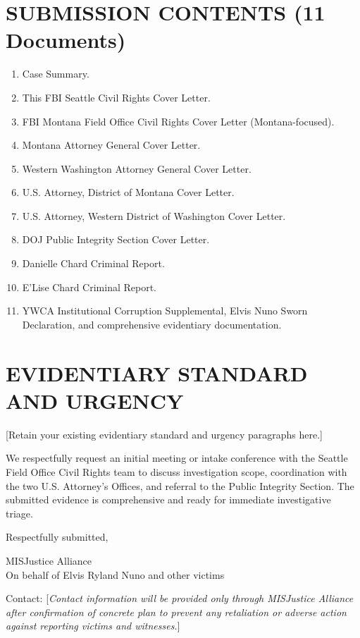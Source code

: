 \documentclass[12pt,oneside]{article}
\begin{document}
\begin{flushleft}
\section*{SUBMISSION CONTENTS (11 Documents)}

\begin{enumerate}
\item Case Summary.
\item This FBI Seattle Civil Rights Cover Letter.
\item FBI Montana Field Office Civil Rights Cover Letter (Montana-focused).
\item Montana Attorney General Cover Letter.
\item Western Washington Attorney General Cover Letter.
\item U.S. Attorney, District of Montana Cover Letter.
\item U.S. Attorney, Western District of Washington Cover Letter.
\item DOJ Public Integrity Section Cover Letter.
\item Danielle Chard Criminal Report.
\item E'Lise Chard Criminal Report.
\item YWCA Institutional Corruption Supplemental, Elvis Nuno Sworn Declaration, and comprehensive evidentiary documentation.
\end{enumerate}

\section*{EVIDENTIARY STANDARD AND URGENCY}

[Retain your existing evidentiary standard and urgency paragraphs here.]

We respectfully request an initial meeting or intake conference with the Seattle Field Office Civil Rights team to discuss investigation scope, coordination with the two U.S. Attorney's Offices, and referral to the Public Integrity Section. The submitted evidence is comprehensive and ready for immediate investigative triage.

\vspace{0.3in}

\noindent
Respectfully submitted,

\vspace{0.3in}

\noindent
MISJustice Alliance \\
On behalf of Elvis Ryland Nuno and other victims

\vspace{0.2in}

\noindent
Contact: [\textit{Contact information will be provided only through MISJustice Alliance after confirmation of concrete plan to prevent any retaliation or adverse action against reporting victims and witnesses.}]

\end{flushleft}
\end{document}
